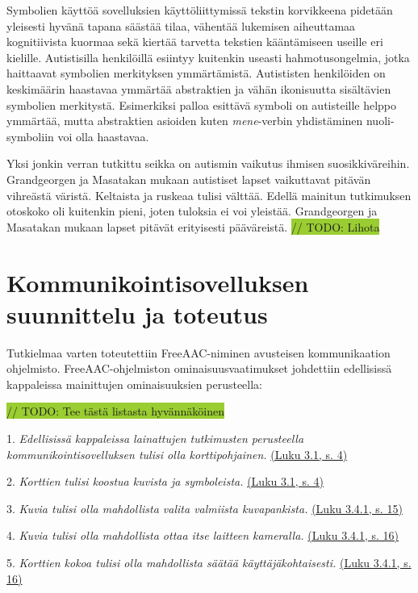\documentclass[utf8]{gradu3}
\begin{document}
\label{symbol-libraries}
Symbolien käyttöä sovelluksien käyttöliittymissä tekstin korvikkeena pidetään yleisesti hyvänä tapana säästää tilaa, vähentää lukemisen aiheuttamaa kognitiivista kuormaa sekä kiertää tarvetta tekstien kääntämiseen useille eri kielille. Autistisilla henkilöillä esiintyy kuitenkin useasti hahmotusongelmia, jotka haittaavat symbolien merkityksen ymmärtämistä. Autististen henkilöiden on keskimäärin haastavaa ymmärtää abstraktien ja vähän ikonisuutta sisältävien symbolien merkitystä. \label{AAC-abstract-symbols} Esimerkiksi palloa esittävä symboli on autisteille helppo ymmärtää, mutta abstraktien asioiden kuten \textit{mene}-verbin yhdistäminen nuoli-symboliin voi olla haastavaa. \parencite[]{symbol-acquisition-autism}

\label{AAC-colors}
Yksi jonkin verran tutkittu seikka on autismin vaikutus ihmisen suosikkiväreihin. Grandgeorgen ja Masatakan \parencite[]{color-preference-autism} mukaan autistiset lapset vaikuttavat pitävän vihreästä väristä. Keltaista ja ruskeaa tulisi välttää. Edellä mainitun tutkimuksen otoskoko oli kuitenkin pieni, joten tuloksia ei voi yleistää. Grandgeorgen ja Masatakan mukaan lapset pitävät erityisesti pääväreistä.   
\colorbox{YellowGreen}{// TODO: Lihota}

\chapter{Kommunikointisovelluksen suunnittelu ja toteutus}

Tutkielmaa varten toteutettiin FreeAAC-niminen avusteisen kommunikaation ohjelmisto. FreeAAC-ohjelmiston ominaisuusvaatimukset johdettiin edellisissä kappaleissa mainittujen ominaisuuksien perusteella:

\colorbox{YellowGreen}{// TODO: Tee tästä listasta hyvännäköinen}

1. \textit{Edellisissä kappaleissa lainattujen tutkimusten perusteella kommunikointisovelluksen tulisi olla korttipohjainen.} \hyperref[AAC-cards]{(Luku 3.1, s. 4)}

2. \textit{Korttien tulisi koostua kuvista ja symboleista.} \hyperref[AAC-symbols]{(Luku 3.1, s. 4)}

3. \textit{Kuvia tulisi olla mahdollista valita valmiista kuvapankista.} \hyperref[symbol-libraries]{(Luku 3.4.1, s. 15)}

4. \textit{Kuvia tulisi olla mahdollista ottaa itse laitteen kameralla.} \hyperref[AAC-photos]{(Luku 3.4.1, s. 16)}

5. \textit{Korttien kokoa tulisi olla mahdollista säätää käyttäjäkohtaisesti.} \hyperref[AAC-cardsize]{(Luku 3.4.1, s. 16)}
\end{document}
